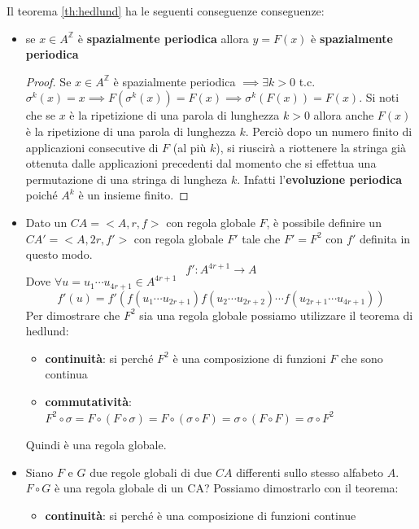 Il teorema \ref{th:hedlund} ha le seguenti conseguenze conseguenze:
\begin{itemize}
    \item se $x\in A^\mathbb{Z}$ è \textbf{spazialmente periodica} allora $y=F(x)$
          è  \textbf{spazialmente periodica}
          \begin{proof}
              Se $x\in A^\mathbb{Z}$  è spazialmente periodica $\implies\exists k>0$ t.c.
              $\sigma^k(x)=x \implies F(\sigma^k(x)) = F(x)\implies \sigma^k(F(x))=F(x)$.
              Si noti che se $x$ è la ripetizione di una parola di lunghezza $k>0$ allora
              anche $F(x)$ è la ripetizione di una parola di lunghezza $k$. Perciò dopo
              un numero finito di applicazioni consecutive di $F$ (al più $k$), si riuscirà
              a riottenere la stringa già ottenuta dalle applicazioni precedenti dal momento
              che si effettua una permutazione di una stringa di lungheza $k$. Infatti l'\textbf{evoluzione
                  periodica} poiché $A^k$ è un insieme finito.
          \end{proof}
    \item Dato un $CA = <A,r,f>$ con regola globale $F$, è possibile definire un  $CA '= <A,2r,f'>$
          con regola globale $F'$ tale che $F'=F^2$ con $f'$ definita in questo modo.
          $$f':A^{4r+1}\rightarrow A$$
          Dove $\forall u=u_1\cdots u_{4r+1}\in A^{4r+1}$
          $$f'(u) = f'(f(u_1\cdots u_{2r+1})f(u_{2}\cdots u_{2r+2})\cdots f(u_{2r+1}\cdots u_{4r+1}))$$
          Per dimostrare che $F^2$ sia una regola globale possiamo utilizzare il teorema di
          hedlund:
          \begin{itemize}
              \item \textbf{continuità}: si perché $F^2$ è una composizione di funzioni $F$ 
              che sono continua
              \item \textbf{commutatività}: $F^2\circ \sigma = F\circ (F\circ \sigma ) = F\circ (\sigma\circ F  ) = \sigma\circ (F\circ F  )  = \sigma \circ F^2$
          \end{itemize}
          Quindi è una regola globale.
    \item Siano $F$ e $G$ due regole globali di due $CA$ differenti sullo stesso
          alfabeto $A$. $F\circ G$ è una regola globale di un CA? Possiamo dimostrarlo con
          il teorema:
          \begin{itemize}
              \item \textbf{continuità}: si perché è una composizione di funzioni continue

\end{itemize}
\end{itemize}
